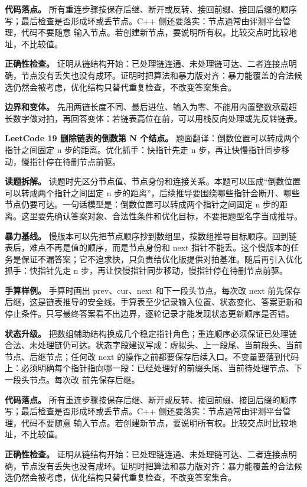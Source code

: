 \textbf{代码落点。} 所有重连步骤按保存后继、断开或反转、接回前缀、接回后缀的顺序写；最后检查是否形成环或丢节点。C++ 侧还要落实：节点通常由评测平台管理，代码不要随意  输入节点。若创建新节点，要说明所有权。比较交点时比较地址，不比较值。

\textbf{正确性检查。} 证明从链结构开始：已处理链连通、未处理链可达、二者连接点明确，节点没有丢失也没有成环。证明时把算法和暴力版对齐：暴力能覆盖的合法候选仍然会被考虑，优化结构只替代重复检查，不改变答案集合。

\textbf{边界和变体。} 先用两链长度不同、最后进位、输入为零、不能用内置整数承载超长数字做对拍，再回答变体：若链表高位在前，可以用栈反向处理或先反转链表。

\noindent\textbf{LeetCode 19 删除链表的倒数第 N 个结点。} 题面翻译：倒数位置可以转成两个指针之间固定 n 步的距离。优化抓手：快指针先走 n 步，再让快慢指针同步移动，慢指针停在待删节点前驱。

\textbf{读题拆解。} 读题时先区分节点值、节点身份和连接关系。本题可以压成“倒数位置可以转成两个指针之间固定 n 步的距离”，后续推导要围绕哪些指针会断开、哪些节点仍要可达。一句话模型是：倒数位置可以转成两个指针之间固定 n 步的距离。这里要先确认答案对象、合法性条件和优化目标，不要把题型名字当成推导。

\textbf{暴力基线。} 慢版本可以先把节点顺序抄到数组里，按数组推导目标顺序。回到链表后，难点不再是值的顺序，而是节点身份和 next 指针不能丢。这个慢版本的任务是保证不漏答案；它不追求快，只负责给优化版提供对拍基准。随后再引入优化抓手：快指针先走 n 步，再让快慢指针同步移动，慢指针停在待删节点前驱。

\textbf{手算样例。} 手算时画出 prev、cur、next 和下一段头节点。每次改 next 前先保存后继，这是链表推导的安全线。手算表至少记录输入位置、状态变化、答案更新和停止条件。只写最终答案看不出边界，逐轮记录才能发现状态更新顺序是否错。

\textbf{状态升级。} 把数组辅助结构换成几个稳定指针角色；重连顺序必须保证已处理链合法、未处理链仍可达。状态字段建议写成：虚拟头、上一段尾、当前段头、当前节点、后继节点；任何改 next 的操作之前都要保存后续入口。不变量要落到代码上：必须明确每个指针指向哪一段：已经处理好的前缀头尾、当前待处理节点、下一段头节点。每次改  前先保存后继。

\textbf{代码落点。} 所有重连步骤按保存后继、断开或反转、接回前缀、接回后缀的顺序写；最后检查是否形成环或丢节点。C++ 侧还要落实：节点通常由评测平台管理，代码不要随意  输入节点。若创建新节点，要说明所有权。比较交点时比较地址，不比较值。

\textbf{正确性检查。} 证明从链结构开始：已处理链连通、未处理链可达、二者连接点明确，节点没有丢失也没有成环。证明时把算法和暴力版对齐：暴力能覆盖的合法候选仍然会被考虑，优化结构只替代重复检查，不改变答案集合。

